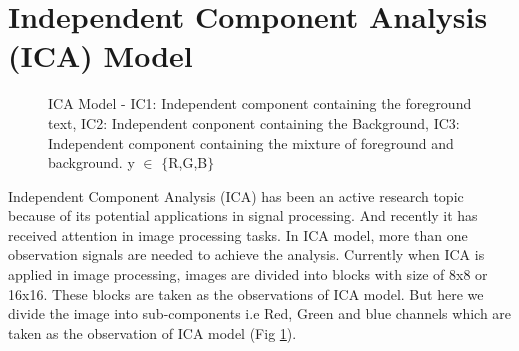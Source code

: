 

\section{Independent Component Analysis (ICA) Model}
\label{sec:format}
 

\begin{figure}[t]
\centering
{}
\caption
{ICA Model - IC1: Independent component containing the foreground text, IC2: Independent
conponent containing the Background, IC3: Independent component containing the mixture of foreground and background.
y $\in$ $\{$R,G,B$\}$}
\label{fig:frame}
\end{figure}
Independent Component Analysis (ICA) has been an active research topic 
because of its potential applications in signal processing. And recently 
it has received attention in image processing tasks.
In ICA model, more than one observation signals are needed to achieve the 
analysis.
Currently when ICA is applied in image processing, images are divided into blocks \cite{chap4-1,chap4-2,chap4-3}  
with size of 8x8 or 16x16. These blocks are taken as the observations of ICA model.
But here we divide the image into sub-components i.e Red, Green and blue channels which are
taken as the observation of ICA model (Fig \ref{fig:frame}). 

